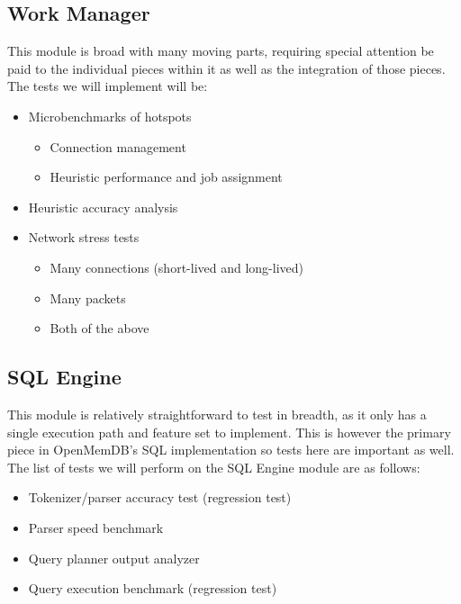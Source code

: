 \documentclass[letterpaper, 12pt]{article}
\begin{document}
\subsection{Work Manager}
This module is broad with many moving parts, requiring special attention be paid to the individual
pieces within it as well as the integration of those pieces. The tests we will implement will be:
\begin{itemize}
 \item Microbenchmarks of hotspots
 \begin{itemize}
  \item Connection management
  \item Heuristic performance and job assignment
 \end{itemize}
 \item Heuristic accuracy analysis
 \item Network stress tests
 \begin{itemize}
  \item Many connections (short-lived and long-lived)
  \item Many packets
  \item Both of the above
 \end{itemize}
\end{itemize}

\subsection{SQL Engine}
This module is relatively straightforward to test in breadth, as it only has a single execution path
and feature set to implement. This is however the primary piece in OpenMemDB's SQL implementation
so tests here are important as well. The list of tests we will perform on the SQL Engine module are
as follows:
\begin{itemize}
 \item Tokenizer/parser accuracy test (regression test)
 \item Parser speed benchmark
 \item Query planner output analyzer
 \item Query execution benchmark (regression test)
\end{itemize}
\end{document}
